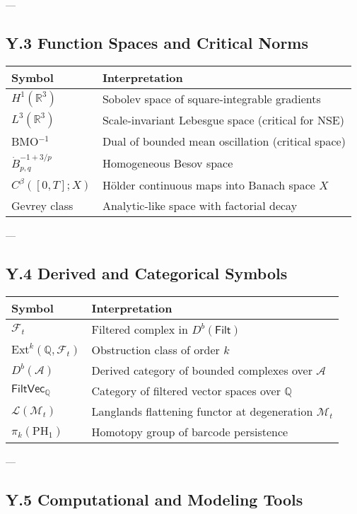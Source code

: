 \documentclass[11pt]{article}
\theoremstyle{definition}
\begin{document}
---

\subsection*{Y.3 Function Spaces and Critical Norms}

\begin{tabular}{ll}
\textbf{Symbol} & \textbf{Interpretation} \\
\hline
$H^1(\mathbb{R}^3)$ & Sobolev space of square-integrable gradients \\
$L^3(\mathbb{R}^3)$ & Scale-invariant Lebesgue space (critical for NSE) \\
BMO$^{-1}$ & Dual of bounded mean oscillation (critical space) \\
$\dot{B}^{-1+3/p}_{p,q}$ & Homogeneous Besov space \\
$C^\beta([0,T];X)$ & Hölder continuous maps into Banach space $X$ \\
Gevrey class & Analytic-like space with factorial decay \\
\end{tabular}

---

\subsection*{Y.4 Derived and Categorical Symbols}

\begin{tabular}{ll}
\textbf{Symbol} & \textbf{Interpretation} \\
\hline
$\mathcal{F}_t$ & Filtered complex in $D^b(\mathsf{Filt})$ \\
$\mathrm{Ext}^k(\mathbb{Q}, \mathcal{F}_t)$ & Obstruction class of order $k$ \\
$D^b(\mathcal{A})$ & Derived category of bounded complexes over $\mathcal{A}$ \\
$\mathsf{FiltVec}_\mathbb{Q}$ & Category of filtered vector spaces over $\mathbb{Q}$ \\
$\mathcal{L}(\mathcal{M}_t)$ & Langlands flattening functor at degeneration $\mathcal{M}_t$ \\
$\pi_k(\mathrm{PH}_1)$ & Homotopy group of barcode persistence \\
\end{tabular}

---

\subsection*{Y.5 Computational and Modeling Tools}
\end{document}
